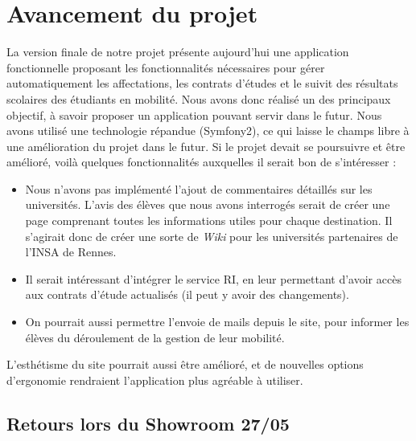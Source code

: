 \chapter{Avancement du projet}

La version finale de notre projet présente aujourd'hui une application fonctionnelle proposant les fonctionnalités nécessaires pour gérer automatiquement les affectations, les contrats d'études et le suivit des résultats scolaires des étudiants en mobilité.
Nous avons donc réalisé un des principaux objectif, à savoir proposer un application pouvant servir dans le futur. Nous avons utilisé une technologie répandue (Symfony2), ce qui laisse le champs libre à une amélioration du projet dans le futur.
\smallbreak
Si le projet devait se poursuivre et être amélioré, voilà quelques fonctionnalités auxquelles il serait bon de s'intéresser :
\begin{itemize}
	\item Nous n'avons pas implémenté l'ajout de commentaires détaillés sur les universités. L'avis des élèves que nous avons interrogés serait de créer une page comprenant toutes les informations utiles pour chaque destination. Il s'agirait donc de créer une sorte de \textit{Wiki} pour les universités partenaires de l'INSA de Rennes.
	\item Il serait intéressant d'intégrer le service RI, en leur permettant d'avoir accès aux contrats d'étude actualisés (il peut y avoir des changements).
	\item On pourrait aussi permettre l'envoie de mails depuis le site, pour informer les élèves du déroulement de la gestion de leur mobilité.
\end{itemize}
\smallbreak
L'esthétisme du site pourrait aussi être amélioré, et de nouvelles options d'ergonomie rendraient l'application plus agréable à utiliser.

\section{Retours lors du Showroom 27/05}

